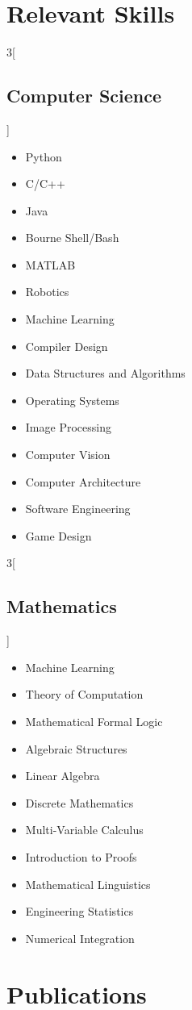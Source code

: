 \documentclass[\ifdefined\cv11pt\else10pt\fi,letterpaper,roman]{moderncv}
\newcommand{\cvonly}[1]{\ifdefined\cv#1\fi}
\newcommand{\resumeonly}[1]{\ifdefined\cv\else#1\fi}
\let\oldsection\section
\renewcommand{\section}[1]{\vspace*{-1ex}\oldsection{#1}}
\let\oldsubsection\subsection
\renewcommand{\subsection}[1]{\vspace*{-1.5ex}\oldsubsection{#1}}
\begin{document}
\setlength{\premulticols}{0pt}
\section{Relevant Skills}
\begin{multicols}{3}[\subsection{Computer Science}\vspace*{-1.2\topsep}]
\begin{itemize}
	\item Python
	\item C/C++
	\item Java
	\item Bourne Shell/Bash
	\cvonly{\item MATLAB}
	\item Robotics
	\resumeonly{\item Machine Learning}  %
	\item Compiler Design
	\item Data Structures and Algorithms
	\item Operating Systems
	\item Image Processing
	\cvonly{\item Computer Vision}
	\item Computer Architecture
	\item Software Engineering
	\cvonly{\item Game Design}
\end{itemize}
\end{multicols}
\vspace{-1ex}

\begin{multicols}{3}[\subsection{Mathematics}\vspace*{-1.2\topsep}]
\begin{itemize}
	\cvonly{\item Machine Learning}  %
	\item Theory of Computation
	\item Mathematical Formal Logic
	\item Algebraic Structures
	\item Linear Algebra
	\item Discrete Mathematics
	\item Multi-Variable Calculus
	\cvonly{
		\item Introduction to Proofs
		\item Mathematical Linguistics
		\item Engineering Statistics
		\item Numerical Integration
	}
\end{itemize}
\end{multicols}
\vspace{-2ex}

\section{Publications}
	\nocite{*}
	\printbibliography[heading=none]{}
\end{document}

